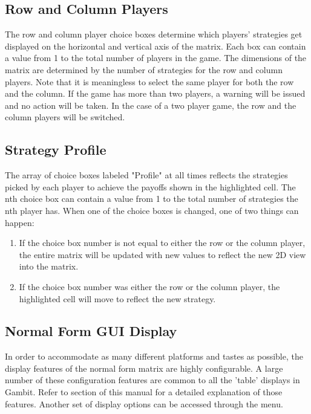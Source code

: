 \subsection{Row and Column Players} The row and column player choice boxes
determine which players' strategies get displayed on the horizontal and
vertical axis of the matrix.  Each box can contain a value from 1 to the
total number of players in the game.  The dimensions of the matrix are
determined by the number of strategies for the row and column players.
Note that it is meaningless to select the same player for both the row and
the column.  If the game has more than two players, a warning will be
issued and no action will be taken.  In the case of a two player game, the
row and the column players will be switched.

\subsection{Strategy Profile}
The array of choice boxes labeled "Profile" at all times reflects the
strategies picked by each player to achieve the payoffs shown in the
highlighted cell.  The nth choice box can contain a value from 1 to the
total number of strategies the nth player has.  When one of the choice
boxes is changed, one of two things can happen:
\begin{enumerate}
\item If the choice box number is not equal to either the row or
the column player, the entire matrix will be updated with new values to
reflect the new 2D view into the matrix.
\item If the choice box number was either the row or the column player,
the highlighted cell will move to reflect the new strategy.
\end{enumerate}

\subsection{Normal Form GUI Display}
In order to accommodate as many different platforms and tastes as possible,
the display features of the normal form matrix are highly configurable.  A
large number of these configuration features are common to all the 'table'
displays in Gambit.  Refer to  section
of this manual for a detailed explanation of those features.  Another set
of display options can be accessed through the 
 menu.

